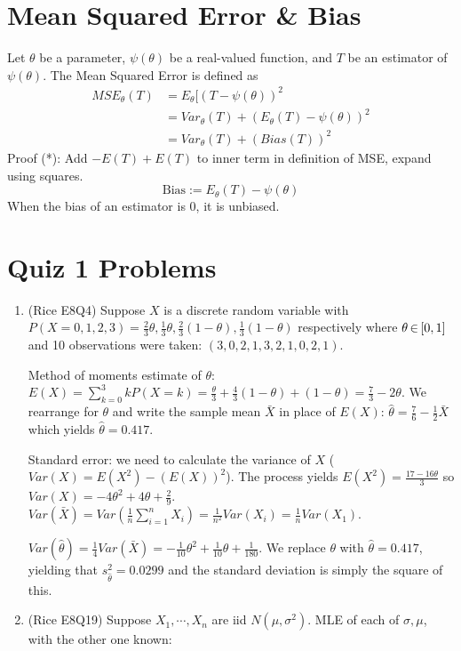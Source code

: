 \documentclass[letterpaper, 8pt]{extarticle}
\begin{document}
\begin{multicols*}{3}
	\section{Mean Squared Error \& Bias}
	Let $\theta$ be a parameter, $\psi(\theta)$ be a real-valued function, and $T$ be an estimator of $\psi(\theta)$. The Mean Squared Error is defined as
	\begin{align*}
		MSE_\theta(T)&=E_\theta[(T-\psi(\theta))^2\\
		&=Var_\theta(T)+(E_\theta(T)-\psi(\theta))^2 \tag{*}\\
		&=Var_\theta(T)+(Bias(T))^2
	\end{align*}
	Proof (*): Add $-E(T)+E(T)$ to inner term in definition of MSE, expand using squares.
	\[\text{Bias}:=E_\theta(T)-\psi(\theta)\]
	When the bias of an estimator is 0, it is unbiased.
	
	\section{Quiz 1 Problems}
	\begin{enumerate}[label=\alph*), wide, labelwidth=0pt, labelindent=0pt]
		\item (Rice E8Q4) Suppose $X$ is a discrete random variable with $P(X=0,1,2,3)=\frac{2}{3}\theta,\frac{1}{3}\theta,\frac{2}{3}(1-\theta),\frac{1}{3}(1-\theta)$ respectively where $\theta\,{\in}\,[0,1]$ and 10 observations were taken: $(3,0,2,1,3,2,1,0,2,1)$. 
		
		Method of moments estimate of $\theta$: $E(X)=\sum_{k=0}^3kP(X=k)=\frac{\theta}{3}+\frac{4}{3}(1-\theta)+(1-\theta)=\frac{7}{3}-2\theta$. We rearrange for $\theta$ and write the sample mean $\bar X$ in place of $E(X)$: $\hat\theta=\frac{7}{6}-\frac{1}{2}\bar X$ which yields $\hat\theta=0.417$.
		
		Standard error: we need to calculate the variance of $X$ ($Var(X)=E(X^2)-(E(X))^2$). The process yields $E(X^2)=\frac{17-16\theta}{3}$ so $Var(X)=-4\theta^2+4\theta+\frac{2}{9}$. $Var(\bar X)=Var(\frac{1}{n}\sum_{i=1}^nX_i)=\frac{1}{n^2}Var(X_i)=\frac{1}{n}Var(X_1)$. 
		
		$Var(\hat\theta)=\frac{1}{4}Var(\bar X)=-\frac{1}{10}\theta^2+\frac{1}{10}\theta+\frac{1}{180}$. We replace $\theta$ with $\hat\theta=0.417$, yielding that $s_{\hat\theta}^2=0.0299$ and the standard deviation is simply the square of this.
		
		\item (Rice E8Q19) Suppose $X_1,\cdots,X_n$ are iid $N(\mu, \sigma^2)$. MLE of each of $\sigma,\mu$, with the other one known: 
		

\end{enumerate}
\end{multicols*}
\end{document}
